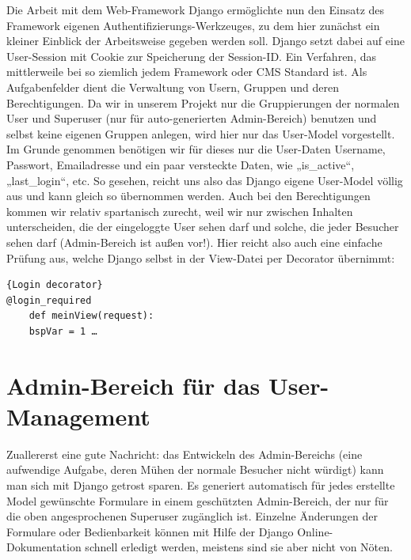 Die Arbeit mit dem Web-Framework Django ermöglichte nun den Einsatz des 
Framework eigenen Authentifizierungs-Werkzeuges, zu dem hier zunächst ein
kleiner Einblick der Arbeitsweise gegeben werden soll. Django setzt dabei
auf eine User-Session mit Cookie zur Speicherung der Session-ID. Ein Verfahren,
das mittlerweile bei so ziemlich jedem Framework oder CMS Standard ist. Als 
Aufgabenfelder dient die Verwaltung von Usern, Gruppen und deren
Berechtigungen. Da wir in unserem Projekt nur die Gruppierungen der normalen 
User und Superuser (nur für auto-generierten Admin-Bereich) benutzen und selbst
keine eigenen Gruppen anlegen, wird hier nur das User-Model vorgestellt. Im
Grunde genommen benötigen wir für dieses nur die User-Daten Username, Passwort,
Emailadresse und ein paar versteckte Daten, wie „is\_active“, „last\_login“,
etc. So gesehen, reicht uns also das Django eigene User-Model völlig aus und 
kann gleich so übernommen werden. Auch bei den Berechtigungen kommen wir relativ 
spartanisch zurecht, weil wir nur zwischen Inhalten unterscheiden, die der 
eingeloggte User sehen darf und solche, die jeder Besucher sehen darf 
(Admin-Bereich ist außen vor!). Hier reicht also auch eine einfache
Prüfung aus, welche Django selbst in der View-Datei per Decorator übernimmt:

\begin{lstlisting}[caption=Decorator]{Login decorator}
@login_required
    def meinView(request):
    bspVar = 1 …
\end{lstlisting}

\section{Admin-Bereich für das User-Management}
Zuallererst eine gute Nachricht: das Entwickeln des Admin-Bereichs (eine
aufwendige Aufgabe, deren Mühen der normale Besucher nicht würdigt) kann man 
sich mit Django getrost sparen. Es generiert automatisch für jedes erstellte 
Model gewünschte Formulare in einem geschützten Admin-Bereich, der nur für die 
oben angesprochenen Superuser zugänglich ist. Einzelne Änderungen der Formulare
oder Bedienbarkeit können mit Hilfe der Django Online-Dokumentation schnell 
erledigt werden, meistens sind sie aber nicht von Nöten.


